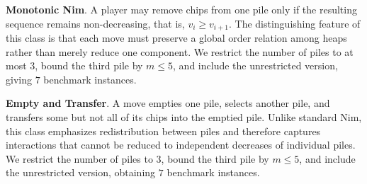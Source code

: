 \documentclass[review]{elsarticle}
\newcommand{\set}[1]{\{ #1 \}}
\newcommand{\tuple}[1]{\langle {#1} \rangle}
\newcommand{\true}{\top}
\newcommand{\statevar}{\mathcal{X}}
\newcommand{\act}{\mathcal{A}}
\newcommand{\constraint}{\mathcal{C}}
\newcommand{\estate}{\mathcal{E}}
\newcommand{\pre}{\mathtt{pre}}
\newcommand{\eff}{\mathtt{eff}}
\begin{document}
\textbf{Monotonic Nim}. A player may remove chips from one pile only if the resulting sequence remains non-decreasing, that is, $v_i \ge v_{i+1}$.
The distinguishing feature of this class is that each move must preserve a global order relation among heaps rather than merely reduce one component.
We restrict the number of piles to at most $3$, bound the third pile by $m \le 5$, and include the unrestricted version, giving $7$ benchmark instances.

\textbf{Empty and Transfer}. A move empties one pile, selects another pile, and transfers some but not all of its chips into the emptied pile.
Unlike standard Nim, this class emphasizes redistribution between piles and therefore captures interactions that cannot be reduced to independent decreases of individual piles.
We restrict the number of piles to $3$, bound the third pile by $m \le 5$, and include the unrestricted version, obtaining $7$ benchmark instances.
\end{document}
